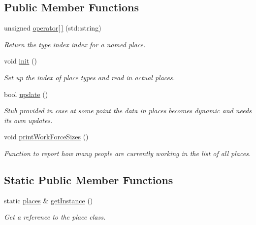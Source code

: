 \subsection*{Public Member Functions}
\begin{DoxyCompactItemize}
\item 
unsigned \mbox{\hyperlink{classplaces_a18b24350e2ad05ef273df442b6d22593}{operator\mbox{[}$\,$\mbox{]}}} (std\+::string)
\begin{DoxyCompactList}\small\item\em Return the type index index for a named place. \end{DoxyCompactList}\item 
void \mbox{\hyperlink{classplaces_ad126c2796c4fecad43f8e237ffde786d}{init}} ()
\begin{DoxyCompactList}\small\item\em Set up the index of place types and read in actual places. \end{DoxyCompactList}\item 
bool \mbox{\hyperlink{classplaces_a5ff3d2cd02c18f353ab15dd86f52e7be}{update}} ()
\begin{DoxyCompactList}\small\item\em Stub provided in case at some point the data in places becomes dynamic and needs its own updates. \end{DoxyCompactList}\item 
\mbox{\label{classplaces_acd22734e55333fc53f937251f7f2ba4f}} 
void \mbox{\hyperlink{classplaces_acd22734e55333fc53f937251f7f2ba4f}{print\+Work\+Force\+Sizes}} ()
\begin{DoxyCompactList}\small\item\em Function to report how many people are currently working in the list of all places. \end{DoxyCompactList}\end{DoxyCompactItemize}
\subsection*{Static Public Member Functions}
\begin{DoxyCompactItemize}
\item 
static \mbox{\hyperlink{classplaces}{places}} \& \mbox{\hyperlink{classplaces_acb5dbcd8606a8a1ffbebc9fb5a3c8a5e}{get\+Instance}} ()
\begin{DoxyCompactList}\small\item\em Get a reference to the place class. \end{DoxyCompactList}\end{DoxyCompactItemize}

